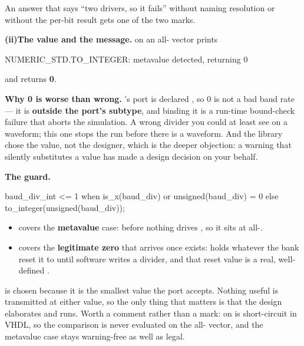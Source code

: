 An answer that says ``two drivers, so it fails'' without naming resolution or without the per-bit
result gets one of the two marks.

\medskip\noindent\textbf{(ii)}\enspace\textbf{The value and the message.}  on an
all- vector prints

\begin{console}
NUMERIC_STD.TO_INTEGER: metavalue detected, returning 0
\end{console}

\noindent and returns \textbf{0}. 

\textbf{Why 0 is worse than wrong.} 's  port is declared
, so 0 is not a bad baud rate --- it is \textbf{outside the port's
subtype}, and binding it is a run-time bound-check failure that aborts the simulation. A wrong
divider you could at least see on a waveform; this one stops the run before there is a waveform. And
the library chose the value, not the designer, which is the deeper objection: a warning that
silently substitutes a value has made a design decision on your behalf.

\textbf{The guard.}

\begin{vhdlcode}
baud_div_int <= 1 when is_x(baud_div) or unsigned(baud_div) = 0
              else to_integer(unsigned(baud_div));
\end{vhdlcode}

\begin{itemize}
  \item {} covers the \textbf{metavalue} case: before  nothing drives
    , so it sits at all-.
  \item {} covers the \textbf{legitimate zero} that arrives once
     exists:  holds whatever the bank reset it to until software
    writes a divider, and that reset value is a real, well-defined .
\end{itemize}

 is chosen because it is the smallest value the port accepts. Nothing useful is transmitted
at either value, so the only thing that matters is that the design elaborates and runs. Worth a
comment rather than a mark:  on  is short-circuit in VHDL, so the comparison
is never evaluated on the all- vector, and the metavalue case stays warning-free as well
as legal.

